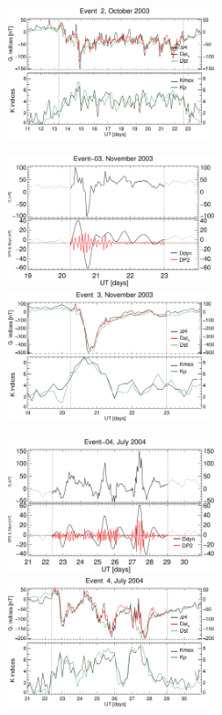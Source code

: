 \documentclass[a4paper,fleqn]{cas-dc}
\begin{document}
\begin{figure}[h!]
   	 \includegraphics[width=6.0cm]{images/dH_approx/diono_valid_V4_2003-10-11.eps}
     \centerline{\Large \bf   
      \hspace{0.275\textwidth}  \color{black}{}
       \hspace{0.295\textwidth}  \color{black}{}
         \hfill}
    \includegraphics[width=6.0cm]{images/diono/iono_PI_V1_2003-11-19.eps} \includegraphics[width=6.0cm]{images/dH_approx/diono_valid_V4_2003-11-19.eps}            
       \centerline{\Large \bf   
      \hspace{0.275\textwidth}  \color{black}{}
       \hspace{0.295\textwidth}  \color{black}{}
         \hfill}
	\includegraphics[width=6.0cm]{images/diono/iono_PI_V1_2004-07-21.eps}     \includegraphics[width=6.0cm]{images/dH_approx/diono_valid_V4_2004-07-21.eps}      

\end{figure}
\end{document}
